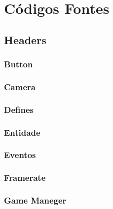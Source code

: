 \newpage
\section{Códigos Fontes}\label{src}

%
\subsection{Headers}\label{.h}

\subsubsection{Button}

\subsubsection{Camera}

\subsubsection{Defines}

\subsubsection{Entidade}

\subsubsection{Eventos}

\subsubsection{Framerate}

\subsubsection{Game Maneger}

